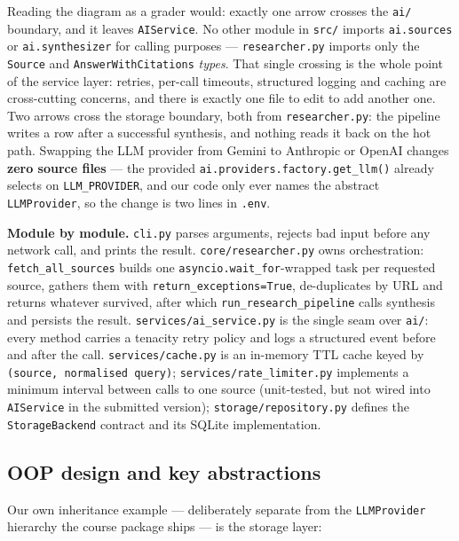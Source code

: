 \documentclass[11pt,a4paper]{article}
\begin{document}
Reading the diagram as a grader would: exactly one arrow crosses the \texttt{ai/} boundary, and
it leaves \texttt{AIService}. No other module in \texttt{src/} imports \texttt{ai.sources} or
\texttt{ai.synthesizer} for calling purposes --- \texttt{researcher.py} imports only the
\texttt{Source} and \texttt{AnswerWithCitations} \emph{types}. That single crossing is the
whole point of the service layer: retries, per-call timeouts, structured logging and caching
are cross-cutting concerns, and there is exactly one file to edit to add another one.
Two arrows cross the storage boundary, both from \texttt{researcher.py}: the pipeline writes a
row after a successful synthesis, and nothing reads it back on the hot path. Swapping the LLM
provider from Gemini to Anthropic or OpenAI changes \textbf{zero source files} --- the provided
\texttt{ai.providers.factory.get\_llm()} already selects on \texttt{LLM\_PROVIDER}, and our code
only ever names the abstract \texttt{LLMProvider}, so the change is two lines in \texttt{.env}.

\textbf{Module by module.}
\texttt{cli.py} parses arguments, rejects bad input before any network call, and prints the
result. \texttt{core/researcher.py} owns orchestration: \texttt{fetch\_all\_sources} builds one
\texttt{asyncio.wait\_for}-wrapped task per requested source, gathers them with
\texttt{return\_exceptions=True}, de-duplicates by URL and returns whatever survived, after
which \texttt{run\_research\_pipeline} calls synthesis and persists the result.
\texttt{services/ai\_service.py} is the single seam over \texttt{ai/}: every method carries a
tenacity retry policy and logs a structured event before and after the call.
\texttt{services/cache.py} is an in-memory TTL cache keyed by \texttt{(source, normalised
query)}; \texttt{services/rate\_limiter.py} implements a minimum interval between calls to one
source (unit-tested, but not wired into \texttt{AIService} in the submitted version); \texttt{storage/repository.py} defines the \texttt{StorageBackend} contract and its
SQLite implementation.

\subsection{OOP design and key abstractions}

Our own inheritance example --- deliberately separate from the \texttt{LLMProvider} hierarchy
the course package ships --- is the storage layer:
\end{document}
